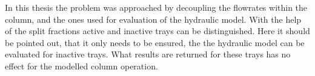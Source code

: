         In this thesis the problem was approached by decoupling the flowrates within the column, and the ones used for evaluation
        of the hydraulic model. With the help of the split fractions active and inactive trays can be distinguished.
        Here it should be pointed out, that it only needs to be ensured, the the hydraulic model can be evaluated for inactive trays.
        What results are returned for these trays has no effect for the modelled column operation.

